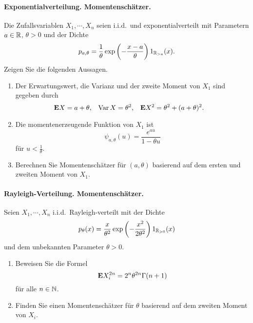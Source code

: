 \paragraph{Exponentialverteilung. Momentenschätzer.} 
Die Zufallsvariablen $X_1, \cdots, X_n$ seien i.i.d.\ und exponentialverteilt mit 
Parametern $a\in \mathbb R$, $\theta>0$ und der Dichte
\begin{equation*}
    p_{a,\theta} =\frac{1}{\theta} \exp \left( - \frac{x-a}{\theta} \right) 1_{\mathbb R_{>a}}(x).
\end{equation*}
Zeigen Sie die folgenden Aussagen.
\begin{enumerate}
    \item Der Erwartungswert, die Varianz und der zweite Moment von $X_1$ sind gegeben durch
        \begin{align*}
            \mathbf{E} X &= a+\theta, & \operatorname{Var} X &= \theta^2, & \mathbf{E} X^2 &= \theta^2 + (a+\theta)^2. 
        \end{align*}
    \item Die momentenerzeugende Funktion von $X_1$ ist 
        \begin{equation*}
            \psi_{a,\theta}(u) = \frac{e^{au}}{1- \theta u}
        \end{equation*}
        für $u<\frac{1}{\theta}$.
    \item Berechnen Sie Momentenschätzer für $(a,\theta)$ basierend auf dem ersten und zweiten 
        Moment von $X_1$. 
\end{enumerate}


\paragraph{Rayleigh-Verteilung. Momentenschätzer. } Seien $X_1, \cdots, X_n$ i.i.d.\ 
Rayleigh-verteilt mit der Dichte
\begin{equation*}
    p_\theta(x) = \frac{x}{\theta^2} \exp \left( - \frac{x^2}{2 \theta^2} \right) 1_{\mathbb R_{>0}}(x)
\end{equation*}
und dem unbekannten Parameter $\theta>0$. 
\begin{enumerate}
    \item Beweisen Sie die Formel
        \begin{equation*}
            \mathbf{E} X^{2n}_i = 2^{n} \theta^{2n} \Gamma(n+1)
        \end{equation*}
        für alle $n\in\mathbb N$. 
        
    \item Finden Sie einen Momentenschätzer für $\theta$ basierend auf dem zweiten Moment von $X_i$.

\end{enumerate}


